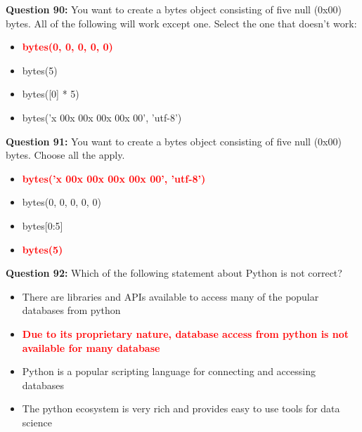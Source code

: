 \documentclass[12pt,a4paper]{article}
\begin{document}
\vspace{0.5cm}

\textbf{Question 90:} You want to create a bytes object consisting of five null (0x00) bytes. All of the following will work except one. Select the one that doesn't work:

\begin{itemize}
    \item[\textbf{A.}] \textcolor{red}{\textbf{bytes(0, 0, 0, 0, 0)}}
    \item[\textbf{B.}] bytes(5)
    \item[\textbf{C.}] bytes([0] * 5)
    \item[\textbf{D.}] bytes('x 00x 00x 00x 00x 00', 'utf-8')
\end{itemize}

\vspace{0.5cm}

\textbf{Question 91:} You want to create a bytes object consisting of five null (0x00) bytes. Choose all the apply.

\begin{itemize}
    \item[\textbf{A.}] \textcolor{red}{\textbf{bytes('x 00x 00x 00x 00x 00', 'utf-8')}}
    \item[\textbf{B.}] bytes(0, 0, 0, 0, 0)
    \item[\textbf{C.}] bytes[0:5]
    \item[\textbf{D.}] \textcolor{red}{\textbf{bytes(5)}}
\end{itemize}

\vspace{0.5cm}

\textbf{Question 92:} Which of the following statement about Python is not correct?

\begin{itemize}
    \item[\textbf{A.}] There are libraries and APIs available to access many of the popular databases from python
    \item[\textbf{B.}] \textcolor{red}{\textbf{Due to its proprietary nature, database access from python is not available for many database}}
    \item[\textbf{C.}] Python is a popular scripting language for connecting and accessing databases
    \item[\textbf{D.}] The python ecosystem is very rich and provides easy to use tools for data science
\end{itemize}
\end{document}
